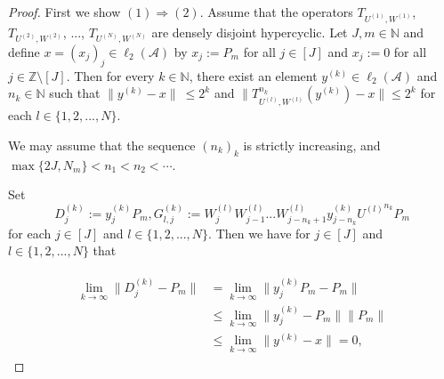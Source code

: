 \documentclass{article}
\begin{document}
\begin{proof}
First we show $(1)\Rightarrow(2)$. Assume that the operators $T_{U^{(1)},W^{(1)}}$, $T_{U^{(2)},W^{(2)}}$, ..., $T_{U^{(N)},W^{(N)}}$ are densely disjoint hypercyclic.
Let $J,m\in\mathbb{N}$ and define $x=(x_{j})_{j}\in \ell_{2}{(\mathcal{A})}$ by $x_{j}:=P_{m}$ for all $j\in[J]$ and $x_{j}:=0$ for all $j\in \mathbb{Z}\setminus[J]$. Then for every $k\in \mathbb{N}$, there exist an element $y^{(k)}\in \ell_{2}{(\mathcal{A})}$ and $n_{k}\in\mathbb{N}$ such that $\|y^{(k)}-x\|\ \leq 2^{k}$ and $\|T^{n_{k}}_{U^{(l)},W^{(l)}}(y^{(k)})-x\|\leq 2^k$ for each $l\in \{1,2,...,N\}$.

We may assume that the sequence $(n_{k})_{k}$ is strictly increasing, and $\max\{2J,N_{m}\}<n_{1}<n_{2}<\cdots$.

Set
\[D^{(k)}_{j}:=y^{(k)}_{j}P_{m}, G^{(k)}_{l,j}:=W^{(l)}_{j}W^{(l)}_{j-1}...W^{(l)}_{j-n_{k}+1}y^{(k)}_{j-n_{k}}{U^{(l)}}^{n_{k}}P_{m}\]
for each $j\in[J]$ and $l\in \{1,2,...,N\}$. Then we have for $j\in[J]$ and $l\in\{1,2,...,N\}$ that

\begin{eqnarray}\begin{split}\nonumber
\lim_{k\rightarrow\infty}\|D^{(k)}_{j}-P_{m}\|
&=\lim_{k\rightarrow\infty}\|y^{(k)}_{j}P_{m}-P_{m}\|\\
&\leq \lim_{k\rightarrow\infty}\|y^{(k)}_{j}-P_{m}\|\|P_{m}\|\\
&\leq\lim_{k\rightarrow\infty}\|y^{(k)}-x\|=0,
\end{split}\end{eqnarray}


\end{proof}
\end{document}
